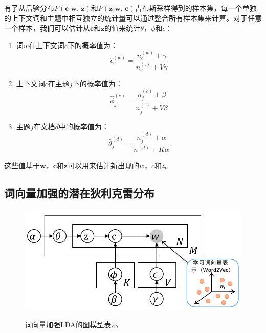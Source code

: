 \documentclass[master]{njuthesis}
\begin{document}
有了从后验分布$P(\textbf{c}|\textbf{w, z})$和$P(\textbf{z}|\textbf{w, c})$吉布斯采样得到的样本集，每一个单独的上下文词和主题中相互独立的统计量可以通过整合所有样本集来计算。对于任意一个样本，我们可以估计从$\textbf{c}$和$\textbf{z}$的值来统计$\theta$，$\phi$和$\epsilon$：
	\begin{enumerate}
	\item 词$w$在上下文词$c$下的概率值为：
		\begin{equation}
		\hat{\epsilon}_{c}^{(w)}=\frac{n_c^{(w)}+\gamma}{n_c^{(.)}+V\gamma}
		\end{equation}
	\item 上下文词$c$在主题$j$下的概率值为：
		\begin{equation}
		\hat{\phi}_{j}^{(c)}=\frac{n_j^{(c)}+\beta}{n_j^{(.)}+V\beta}
		\end{equation}
	\item 主题$j$在文档$d$中的概率值为：
		\begin{equation}
		\hat{\theta}_{j}^{(d)}=\frac{n_{j}^{(d)}+\alpha}{n_{.}^{(d)}+K\alpha}
		\end{equation}	
	\end{enumerate}
	这些值基于$\textbf{w}$，$\textbf{c}$和$\textbf{z}$可以用来估计新出现的$w$，$c$和$z$。

\subsection{词向量加强的潜在狄利克雷分布}\label{subsec_enhanced_lda_chap5}
 
\begin{figure}[htbp]
\centering
\includegraphics[width= 1.0\textwidth]{figures//weeLDA_chap5.pdf}\\
\caption{词向量加强LDA的图模型表示}\label{fig:weeLDA_chap5}
\end{figure}
\end{document}
